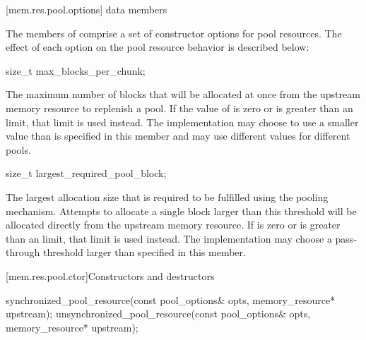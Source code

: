 [mem.res.pool.options]{ data members}

\pnum
The members of 
comprise a set of constructor options for pool resources.
The effect of each option on the pool resource behavior is described below:

%
\begin{itemdecl}
size_t max_blocks_per_chunk;
\end{itemdecl}

\begin{itemdescr}
\pnum
The maximum number of blocks that will be allocated at once
from the upstream memory resource
to replenish a pool.
If the value of  is zero or
is greater than an 
limit, that limit is used instead.
The implementation
may choose to use a smaller value than is specified in this member and
may use different values for different pools.
\end{itemdescr}

%
\begin{itemdecl}
size_t largest_required_pool_block;
\end{itemdecl}

\begin{itemdescr}
\pnum
The largest allocation size that is required to be fulfilled
using the pooling mechanism.
Attempts to allocate a single block larger than this threshold
will be allocated directly from the upstream memory resource.
If  is zero or
is greater than an 
limit, that limit is used instead.
The implementation may choose a pass-through threshold
larger than specified in this member.
\end{itemdescr}

[mem.res.pool.ctor]{Constructors and destructors}

%
%
\begin{itemdecl}
synchronized_pool_resource(const pool_options& opts, memory_resource* upstream);
unsynchronized_pool_resource(const pool_options& opts, memory_resource* upstream);
\end{itemdecl}

